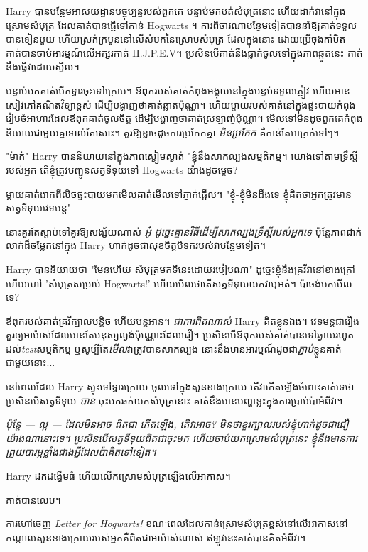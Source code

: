 Harry បានបន្ថែមអាសយដ្ឋានបច្ចុប្បន្នរបស់ពួកគេ បន្ទាប់មកបត់សំបុត្រនោះ ហើយដាក់វានៅក្នុងស្រោមសំបុត្រ ដែលគាត់បានផ្ញើទៅកាន់ Hogwarts ។ ការពិចារណាបន្ថែមទៀតបាននាំឱ្យគាត់ទទួលបានទៀនមួយ ហើយស្រក់ក្រមួននៅលើសំបកនៃស្រោមសំបុត្រ ដែលក្នុងនោះ ដោយប្រើចុងកាំបិត គាត់បានចាប់អារម្មណ៍លើអក្សរកាត់ H.J.P.E.V\@ ។ ប្រសិន​បើ​គាត់​នឹង​ធ្លាក់​ចូល​ទៅ​ក្នុង​ភាព​ឆ្កួត​នេះ គាត់​នឹង​ធ្វើ​វា​ដោយ​ស្ទីល​។

បន្ទាប់​មក​គាត់​បើក​ទ្វារ​ចុះ​ទៅ​ក្រោម។ ឪពុករបស់គាត់កំពុងអង្គុយនៅក្នុងបន្ទប់ទទួលភ្ញៀវ ហើយអានសៀវភៅគណិតវិទ្យាខ្ពស់ ដើម្បីបង្ហាញថាគាត់ឆ្លាតប៉ុណ្ណា។ ហើយ​ម្តាយ​របស់គាត់​នៅក្នុង​ផ្ទះបាយ​កំពុង​រៀបចំ​អាហារ​ដែល​ឪពុក​គាត់​ចូលចិត្ត ដើម្បី​បង្ហាញ​ថា​គាត់​ស្រឡាញ់​ប៉ុណ្ណា​។ មើលទៅមិនដូចពួកគេកំពុងនិយាយជាមួយគ្នាទាល់តែសោះ។ គួរឱ្យខ្លាចដូចការប្រកែកគ្នា \emph{មិនប្រកែក} គឺកាន់តែអាក្រក់ទៅៗ។

"ម៉ាក់" Harry បាននិយាយនៅក្នុងភាពស្ងៀមស្ងាត់ "ខ្ញុំនឹងសាកល្បងសម្មតិកម្ម។ យោងទៅតាមទ្រឹស្តីរបស់អ្នក តើខ្ញុំត្រូវបញ្ជូនសត្វទីទុយទៅ Hogwarts យ៉ាងដូចម្តេច?

ម្ដាយ​គាត់​ងាក​ពី​លិច​ផ្ទះបាយ​មក​មើល​គាត់​មើល​ទៅ​ភ្ញាក់ផ្អើល។ "ខ្ញុំ-ខ្ញុំមិនដឹងទេ ខ្ញុំគិតថាអ្នកត្រូវមានសត្វទីទុយវេទមន្ត"

នោះគួរតែស្តាប់ទៅគួរឱ្យសង្ស័យណាស់ \emph{អូ៎ ដូច្នេះគ្មានវិធីដើម្បីសាកល្បងទ្រឹស្ដីរបស់អ្នកទេ} ប៉ុន្តែភាពជាក់លាក់ដ៏ចម្លែកនៅក្នុង Harry ហាក់ដូចជាសុខចិត្តបិទករបស់វាបន្ថែមទៀត។

Harry បាននិយាយថា "មែនហើយ សំបុត្រមកទីនេះដោយរបៀបណា" ដូច្នេះខ្ញុំនឹងគ្រវីវានៅខាងក្រៅ ហើយហៅ 'សំបុត្រសម្រាប់ Hogwarts!' ហើយមើលថាតើសត្វទីទុយយកវាឬអត់។ ប៉ាចង់មកមើលទេ?

ឪពុករបស់គាត់គ្រវីក្បាលបន្តិច ហើយបន្តអាន។ \emph{ជាការពិតណាស់} Harry គិតខ្លួនឯង។ វេទមន្ត​ជា​រឿង​គួរ​ឲ្យ​អាម៉ាស់​ដែល​មាន​តែ​មនុស្ស​ល្ងង់​ប៉ុណ្ណោះ​ដែល​ជឿ។ ប្រសិនបើឪពុករបស់គាត់បានទៅឆ្ងាយរហូតដល់\emph{test}សម្មតិកម្ម ឬសូម្បីតែ\emph{មើល}វាត្រូវបានសាកល្បង នោះនឹងមានអារម្មណ៍ដូចជា\emph{ភ្ជាប់}ខ្លួនគាត់ជាមួយនោះ...

នៅពេលដែល Harry ស្ទុះទៅទ្វារក្រោយ ចូលទៅក្នុងសួនខាងក្រោយ តើវាកើតឡើងចំពោះគាត់ទេថា ប្រសិនបើសត្វទីទុយ \emph{បាន} ចុះមកឆក់យកសំបុត្រនោះ គាត់នឹងមានបញ្ហាខ្លះក្នុងការប្រាប់ប៉ាអំពីវា។

\emph{ប៉ុន្តែ — ល្អ — ដែល​មិន​អាច \emph{ ពិត​ជា​} កើត​ឡើង​, តើ​វា​អាច​? មិនថាខួរក្បាលរបស់ខ្ញុំហាក់ដូចជាជឿយ៉ាងណានោះទេ។ ប្រសិនបើសត្វទីទុយពិតជាចុះមក ហើយចាប់យកស្រោមសំបុត្រនេះ ខ្ញុំនឹងមានការព្រួយបារម្ភខ្លាំងជាងអ្វីដែលប៉ាគិតទៅទៀត។}

Harry ដកដង្ហើមធំ ហើយលើកស្រោមសំបុត្រឡើងលើអាកាស។

គាត់បានលេប។

ការហៅចេញ \emph{Letter for Hogwarts!} ខណៈពេលដែលកាន់ស្រោមសំបុត្រខ្ពស់នៅលើអាកាសនៅកណ្តាលសួនខាងក្រោយរបស់អ្នកគឺពិតជាអាម៉ាស់ណាស់ ឥឡូវនេះគាត់បានគិតអំពីវា។

